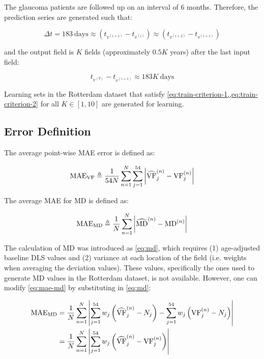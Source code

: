 The glaucoma patients are followed up on an interval of 6 months. Therefore, the prediction series are generated such that: 

\begin{equation} \label{eq:train-criterion-1}
\Delta t = 183~\textrm{days} \approx (t_{v^{(i+1)}} - t_{v^{(i)}}) \approx (t_{v^{(i+2)}} - t_{v^{(i+1)}})
\end{equation}

and the output field is $K$ fields (approximately $0.5K$ years) after the last input field:

\begin{equation} \label{eq:train-criterion-2}
t_{v^{(Y)}} - t_{v^{(i+1)}} \approx 183K~\textrm{days}
\end{equation}

Learning sets in the Rotterdam dataset that satisfy \cref{eq:train-criterion-1,,eq:train-criterion-2} for all $K\in[1, 10]$ are generated for learning.

\subsection{Error Definition}

The average point-wise \ac{MAE} error is defined as:

\begin{equation}
\textrm{MAE}_{\textrm{VF}} \triangleq 
\frac{1}{54N} \sum_{n=1}^N \sum_{j=1}^{54} \left|  \widehat{\textrm{VF}}_j^{(n)} - {\textrm{VF}}_j^{(n)}  \right|
\end{equation}

The average \ac{MAE} for \ac{MD} is defined as:

\begin{equation} \label{eq:mae-md}
\textrm{MAE}_{\textrm{MD}} \triangleq
\frac{1}{N} \sum_{n=1}^N \left|  \widehat{\textrm{MD}}^{(n)} - {\textrm{MD}}^{(n)}  \right|
\end{equation}

The calculation of \ac{MD} was introduced as \cref{eq:md}, which requires (1) age-adjusted baseline \ac{DLS} values and (2) variance at each location of the field (i.e. weights when averaging the deviation values). These values, specifically the ones used to generate \ac{MD} values in the Rotterdam dataset, is not available. However, one can modify \cref{eq:mae-md} by substituting in \cref{eq:md}:

\begin{align}
\textrm{MAE}_{\textrm{MD}} &=
\frac{1}{N} \sum_{n=1}^N \left| 
\sum_{j=1}^{54} w_j \left( \widehat{\textrm{VF}}_j^{(n)} - N_j \right) - 
\sum_{j=1}^{54} w_j \left( {\textrm{VF}}_j^{(n)} - N_j \right)  \right| \\
&=
\frac{1}{N} \sum_{n=1}^N \left| 
\sum_{j=1}^{54} w_j \left( \widehat{\textrm{VF}}_j^{(n)} - \textrm{VF}_j^{(n)} \right) \right|
\end{align}

